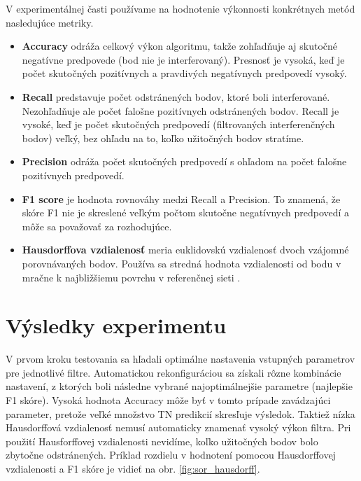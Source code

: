 V experimentálnej časti používame na hodnotenie výkonnosti konkrétnych metód nasledujúce metriky.

\begin{itemize}
	\item \textbf{Accuracy} odráža celkový výkon algoritmu, takže zohľadňuje aj skutočné negatívne predpovede (bod nie je interferovaný). Presnosť je vysoká, keď je počet skutočných pozitívnych a pravdivých negatívnych predpovedí vysoký.
	
	\item \textbf{Recall} predstavuje počet odstránených bodov, ktoré boli interferované. Nezohľadňuje ale počet falošne pozitívnych odstránených bodov. Recall je vysoké, keď je počet skutočných predpovedí (filtrovaných interferenčných bodov) veľký, bez ohľadu na to, koľko užitočných bodov stratíme.
	
	\item \textbf{Precision} odráža počet skutočných predpovedí s ohľadom na počet falošne pozitívnych predpovedí.
	
	\item \textbf{F1 score} je hodnota rovnováhy medzi Recall a Precision. To znamená, že skóre F1 nie je skreslené veľkým počtom skutočne negatívnych predpovedí a môže sa považovať za rozhodujúce.
	
	\item \textbf{Hausdorffova vzdialenosť} meria euklidovskú vzdialenosť dvoch vzájomné porovnávaných bodov. Používa sa stredná hodnota vzdialenosti od bodu v mračne k najbližšiemu povrchu v referenčnej sieti .
\end{itemize}

\section{Výsledky experimentu}

V prvom kroku testovania sa hľadali optimálne nastavenia vstupných parametrov pre jednotlivé filtre. Automatickou rekonfiguráciou sa získali rôzne kombinácie nastavení, z ktorých boli následne vybrané najoptimálnejšie parametre (najlepšie F1 skóre). Vysoká hodnota Accuracy môže byť v tomto prípade zavádzajúci parameter, pretože veľké množstvo TN predikcií skresľuje výsledok. Taktiež nízka Hausdorffová vzdialenosť nemusí automaticky znamenať vysoký výkon filtra. Pri použití Hausforffovej vzdialenosti nevidíme, koľko užitočných bodov bolo zbytočne odstránených. Príklad rozdielu v hodnotení pomocou Hausdorffovej vzdialenosti a F1 skóre je vidieť na obr. \ref{fig:sor_hausdorff}. 


